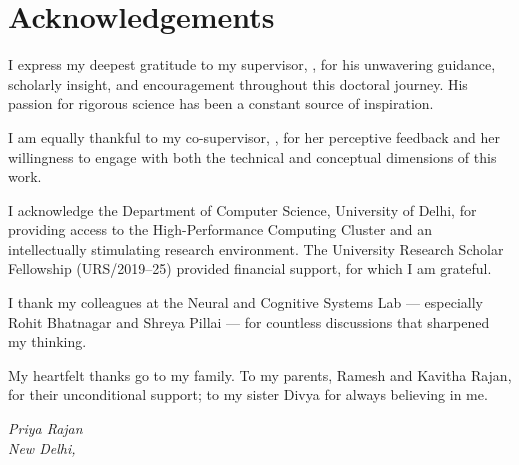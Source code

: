 \chapter*{Acknowledgements}
\thispagestyle{plain}

I express my deepest gratitude to my supervisor, \thesissupervisor, for his unwavering
guidance, scholarly insight, and encouragement throughout this doctoral journey. His
passion for rigorous science has been a constant source of inspiration.

\medskip
I am equally thankful to my co-supervisor, \thesiscosupervisor, for her perceptive
feedback and her willingness to engage with both the technical and conceptual dimensions
of this work.

\medskip
I acknowledge the Department of Computer Science, University of Delhi, for providing
access to the High-Performance Computing Cluster and an intellectually stimulating
research environment. The University Research Scholar Fellowship (URS/2019--25) provided
financial support, for which I am grateful.

\medskip
I thank my colleagues at the Neural and Cognitive Systems Lab --- especially
Rohit Bhatnagar and Shreya Pillai --- for countless discussions that sharpened my thinking.

\medskip
My heartfelt thanks go to my family. To my parents, Ramesh and Kavitha Rajan, for their
unconditional support; to my sister Divya for always believing in me.

\vspace{1cm}
\begin{flushright}
  \textit{Priya Rajan}\\
  \textit{New Delhi, \submissionmonth}
\end{flushright}

